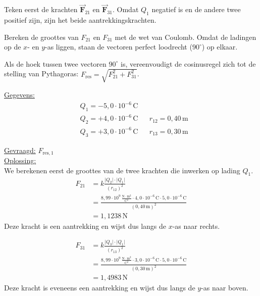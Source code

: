 \documentclass{ximera}
\begin{document}
\begin{exercise}
    \begin{hint}
        Teken eerst de krachten $\vec{\mathbf{F}}_{21}$ en $\vec{\mathbf{F}}_{31}$. Omdat $Q_1$ negatief is en de andere twee positief zijn, zijn het beide aantrekkingskrachten.
    \end{hint}
    \begin{hint}
        Bereken de groottes van $F_{21}$ en $F_{31}$ met de wet van Coulomb. Omdat de ladingen op de $x$- en $y$-as liggen, staan de vectoren perfect loodrecht ($90^\circ$) op elkaar.
    \end{hint}
    \begin{hint}
        Als de hoek tussen twee vectoren $90^\circ$ is, vereenvoudigt de cosinusregel zich tot de stelling van Pythagoras: $F_{\text{res}} = \sqrt{F_{21}^2 + F_{31}^2}$.
    \end{hint}

    \begin{solution}\nl
        \underline{Gegevens:}
        \begin{align*}
            & Q_{1} = -5{,}0 \cdot 10^{-6} \, \mathrm{C} & & \\
            & Q_{2} = +4{,}0 \cdot 10^{-6} \, \mathrm{C} & & r_{12} = 0{,}40 \, \mathrm{m}\\
            & Q_{3} = +3{,}0 \cdot 10^{-6} \, \mathrm{C} & & r_{13} = 0{,}30 \, \mathrm{m}
        \end{align*}

        \underline{Gevraagd:} $F_{\text{res},1}$\\

        \underline{Oplossing:}\\
        We berekenen eerst de groottes van de twee krachten die inwerken op lading $Q_{1}$.
        \begin{align*}
            F_{21} &= k\frac{\lvert Q_{2}\rvert\cdot\lvert Q_{1}\rvert}{(r_{12})^{2}} \\
            &= \frac{8{,}99 \cdot 10^9 \, \mathrm{\frac{N \cdot m^2}{C^2}} \cdot 4{,}0 \cdot 10^{-6} \, \mathrm{C} \cdot 5{,}0 \cdot 10^{-6} \, \mathrm{C}}{(0{,}40 \, \mathrm{m})^{2}} \\
            &= 1{,}1238 \, \mathrm{N}
        \end{align*}
        Deze kracht is een aantrekking en wijst dus langs de $x$-as naar rechts.

        \begin{align*}
            F_{31} &= k\frac{\lvert Q_{3}\rvert\cdot\lvert Q_{1}\rvert}{(r_{13})^{2}} \\
            &= \frac{8{,}99 \cdot 10^9 \, \mathrm{\frac{N \cdot m^2}{C^2}} \cdot 3{,}0 \cdot 10^{-6} \, \mathrm{C} \cdot 5{,}0 \cdot 10^{-6} \, \mathrm{C}}{(0{,}30 \, \mathrm{m})^{2}} \\
            &= 1{,}4983 \, \mathrm{N}
        \end{align*}
        Deze kracht is eveneens een aantrekking en wijst dus langs de $y$-as naar boven.


\end{solution}
\end{exercise}
\end{document}
